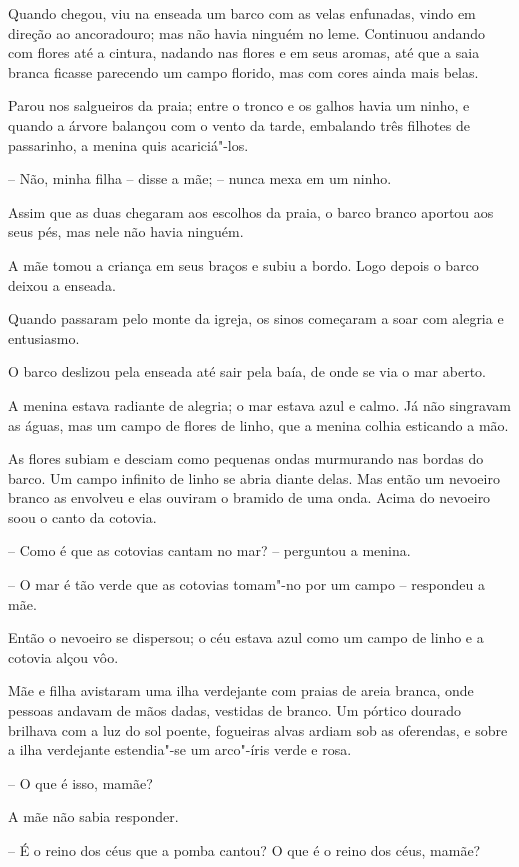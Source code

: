 Quando chegou, viu na enseada um barco com as velas enfunadas, vindo em
direção ao ancoradouro; mas não havia ninguém no leme. Continuou
andando com flores até a cintura, nadando nas flores e em seus aromas,
até que a saia branca ficasse parecendo um campo florido, mas com cores
ainda mais belas.

Parou nos salgueiros da praia; entre o tronco e os galhos havia um
ninho, e quando a árvore balançou com o vento da tarde, embalando três
filhotes de passarinho, a menina quis acariciá"-los.

-- Não, minha filha -- disse a mãe; -- nunca mexa em um ninho.

Assim que as duas chegaram aos escolhos da praia, o barco branco aportou
aos seus pés, mas nele não havia ninguém. 

A mãe tomou a criança em seus braços e subiu a bordo. Logo depois o
barco deixou a enseada. 

Quando passaram pelo monte da igreja, os sinos começaram a soar com
alegria e entusiasmo. 

O barco deslizou pela enseada até sair pela baía, de onde se via o mar
aberto. 

A menina estava radiante de alegria; o mar estava azul e calmo. Já não
singravam as águas, mas um campo de flores de linho, que a menina
colhia esticando a mão.

As flores subiam e desciam como pequenas ondas murmurando nas bordas do
barco. Um campo infinito de linho se abria diante delas. Mas então um
nevoeiro branco as envolveu e elas ouviram o bramido de uma onda. Acima
do nevoeiro soou o canto da cotovia.

-- Como é que as cotovias cantam no mar? -- perguntou a menina.

-- O mar é tão verde que as cotovias tomam"-no por um campo -- respondeu
a mãe.

Então o nevoeiro se dispersou; o céu estava azul como um campo de linho
e a cotovia alçou vôo.

Mãe e filha avistaram uma ilha verdejante com praias de areia branca,
onde pessoas andavam de mãos dadas, vestidas de branco. Um pórtico
dourado brilhava com a luz do sol poente, fogueiras alvas ardiam sob as
oferendas, e sobre a ilha verdejante estendia"-se um arco"-íris verde
e rosa.

-- O que é isso, mamãe?

A mãe não sabia responder.

-- É o reino dos céus que a pomba cantou? O que é o reino dos céus,
mamãe?

